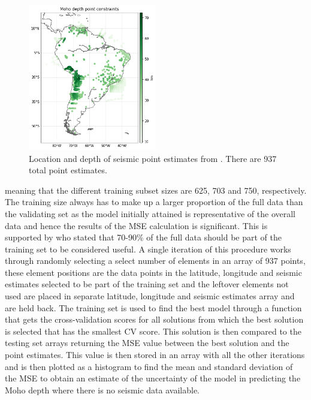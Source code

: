 \begin{figure}[h]
  \begin{center}
    \includegraphics[width=0.5\textwidth]{figures/Seismic-locations}
  \end{center}
  \caption{
   Location and depth of seismic point estimates from \cite{Assumpo2013}. There are 937 total point estimates.
  }
  \label{fig:seismic_locations}
\end{figure}
meaning that the different training subset sizes are 625, 703 and 750, respectively. The training size always has to make up a larger proportion of the full data than the validating set as the model initially attained is representative of the overall data and hence the results of the MSE calculation is significant. This is supported by \cite{Berrar2019} who stated that 70-90\% of the full data should be part of the training set to be considered useful.
A single iteration of this procedure works through randomly selecting a select number of elements in an array of 937 points, these element positions are the data points in the latitude, longitude and seismic estimates selected to be part of the training set and the leftover elements not used are placed in separate latitude, longitude and seismic estimates array and are held back. The training set is used to find the best model through a function that gets the cross-validation scores for all solutions from which the best solution is selected that has the smallest CV score. This solution is then compared to the testing set arrays returning the MSE value between the best solution and the point estimates. This value is then stored in an array with all the other iterations and is then plotted as a histogram to find the mean and standard deviation of the MSE to obtain an estimate of the uncertainty of the model in predicting the Moho depth where there is no seismic data available.
